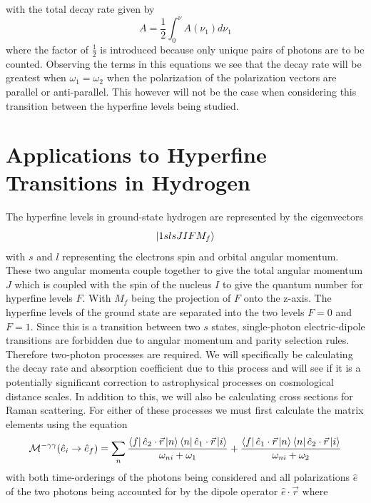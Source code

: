 with the total decay rate given by
\begin{equation}
    A=\frac{1}{2}\int_0^\nu A(\nu_1)d\nu_1
\end{equation}
where the factor of \(\frac{1}{2}\) is introduced because only unique pairs of photons are to be counted.
Observing the terms in this equations we see that the decay rate will be greatest when \(\omega_1 = \omega_2\) when the polarization of the polarization vectors are parallel or anti-parallel. This however will not be the case when considering this transition between the hyperfine levels being studied.

\section{Applications to Hyperfine Transitions in Hydrogen}
The hyperfine levels in ground-state hydrogen are represented by the eigenvectors
\begin{equation}
    \ket{1slsJIFM_f}
\end{equation}
with $s$ and $l$ representing the electrons spin and orbital angular momentum. These two angular momenta couple together to give the total angular momentum $J$ which is coupled with the spin of the nucleus $I$ to give the quantum number for hyperfine levels $F$. With \(M_f\) being the projection of $F$ onto the z-axis. The hyperfine levels of the ground state are separated into the two levels $F=0$ and $F=1$. Since this is a transition between two $s$ states, single-photon electric-dipole transitions are forbidden due to angular momentum and parity selection rules. Therefore two-photon processes are required. We will specifically be calculating the decay rate and absorption coefficient due to this process and will see if it is a potentially significant correction to astrophysical processes on cosmological distance scales. In addition to this, we will also be calculating cross sections for Raman scattering. For either of these processes we must first calculate the matrix elements using the equation
\begin{equation}
    \mathcal{M}^{-\gamma\gamma}(\hat{e}_i\rightarrow \hat{e}_f)=
    \sum_{n}
    \frac{
    \bra{f}\hat{e}_{2}\cdot
    \Vec{r}\ket{n}
    \bra{n}\hat{e}_{1}\cdot\Vec{r}\ket{i}}
    {\omega_{ni}+\omega_{1}}
    +
    \frac{
    \bra{f}\hat{e}_{1}\cdot\Vec{r}\ket{n}
    \bra{n}\hat{e}_{2}\cdot\Vec{r}\ket{i}}
    {\omega_{ni}+\omega_{2}}
\end{equation}
with both time-orderings of the photons being considered and all polarizations $\hat{e}$ of the two photons being accounted for by the dipole operator \(\hat{e}\cdot\Vec{r}\) where
